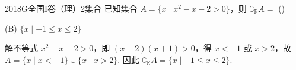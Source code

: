 
\begin{problem}{2018}{G}{全国I卷（理）}{2}{集合}
已知集合 $ A = \{x \mid x^2 - x - 2 > 0\} $，则 $ \complement_{\mathbb{R}} A = $ (\hspace{1cm})
\begin{choices}
\end{choices}
\end{problem}

\begin{answer}
(B) $\{x \mid -1 \leqslant x \leqslant 2\}$
\end{answer}

\begin{solutions}
解不等式 $ x^2 - x - 2 > 0 $，即 $ (x - 2)(x + 1) > 0 $，得 $ x < -1 $ 或 $ x > 2 $，故 $ A = \{x \mid x < -1\} \cup \{x \mid x > 2\} $.  
因此 $ \complement_{\mathbb{R}} A = \{x \mid -1 \leqslant x \leqslant 2\} $.
\end{solutions}